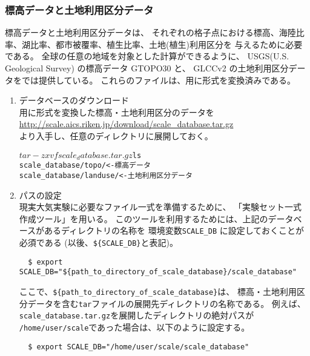 \subsubsection{標高データと土地利用区分データ}
標高データと土地利用区分データは、
それぞれの格子点における標高、海陸比率、湖比率、都市被覆率、植生比率、土地(植生)利用区分を
与えるために必要である。
全球の任意の地域を対象とした計算ができるように、
USGS(U.S. Geological Survey) の標高データ GTOPO30 と、
GLCCv2 の土地利用区分データを{\scalerm}では提供している。 
これらのファイルは、{\scalerm}用に形式を変換済みである。

\begin{enumerate}
\item データベースのダウンロード\\
\scalerm 用に形式を変換した標高・土地利用区分のデータを\\
 \url{http://scale.aics.riken.jp/download/scale_database.tar.gz}\\
より入手し、任意のディレクトリに展開しておく。
\begin{alltt}
  $ tar -zxvf scale_database.tar.gz
  $ ls
    scale_database/topo/    <- 標高データ
    scale_database/landuse/ <- 土地利用区分データ
\end{alltt}

\item パスの設定\\
現実大気実験に必要なファイル一式を準備するために、
「実験セット一式作成ツール」を用いる。
このツールを利用するためには、上記のデータベースがあるディレクトリの名称を
環境変数\verb|SCALE_DB| に設定しておくことが必須である (以後、\verb|${SCALE_DB}|と表記)。
\begin{verbatim}
  $ export SCALE_DB="${path_to_directory_of_scale_database}/scale_database"
\end{verbatim}
ここで、\verb|${path_to_directory_of_scale_database}|は、
標高・土地利用区分データを含む\verb|tar|ファイルの展開先ディレクトリの名称である。
例えば、\verb|scale_database.tar.gz|を展開したディレクトリの絶対パスが
\verb|/home/user/scale|であった場合は、以下のように設定する。
\begin{verbatim}
  $ export SCALE_DB="/home/user/scale/scale_database"
\end{verbatim}
\end{enumerate}



